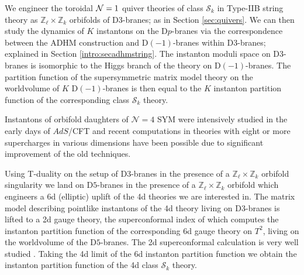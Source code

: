 \documentclass[main.tex]{subfiles}
\begin{document}
We engineer the toroidal $\mathcal{N}=1$ quiver theories of class $\mathcal{S}_k$ in Type-IIB string theory as $\mathbb{Z}_\ell \times \mathbb{Z}_k$ orbifolds of D$3$-branes; as in Section \ref{sec:quivers}.
We can then study the dynamics of $K$ instantons on the D$p$-branes via
the correspondence between the ADHM construction \cite{Atiyah:1978ri} and D$(-1)$-branes within D$3$-branes; explained in Section \ref{intro:secadhmstring}. The instanton moduli space on D$3$-branes is isomorphic to the Higgs branch of the theory on D$(-1)$-branes.
The partition function of the supersymmetric matrix model theory on the worldvolume of $K$ D$(-1)$-branes is then equal to the $K$ instanton partition function of the corresponding  class $\mathcal{S}_k$ theory.

Instantons of orbifold daughters of $\mathcal{N}=4$ SYM were intensively studied in the early days of $AdS$/CFT \cite{Dorey:1999pd,Hollowood:1999bm,Billo:2002hm,Billo:2006jm,Billo:2007py,Argurio:2007vqa,Billo:2008sp} and recent computations in theories with eight or more supercharges in various dimensions \cite{Hwang:2014uwa,Kim:2011mv,Kim:2017xan,Haghighat:2013tka,Haghighat:2013gba} have been possible due to significant improvement of the old techniques.

Using T-duality on the setup of D$3$-branes in the presence of a  $\mathbb{Z}_\ell \times \mathbb{Z}_k$ orbifold singularity we land on D$5$-branes in the presence of a $\mathbb{Z}_\ell \times \mathbb{Z}_k$ orbifold which engineers a 6d (elliptic) uplift of the 4d theories we are interested in.
The matrix model describing pointlike instantons of the 4d theory living on D$3$-branes is lifted to a 2d gauge theory, the superconformal index of which computes the instanton partition function of the corresponding 6d gauge theory on $T^2$, living on the worldvolume of the D$5$-branes. 
The 2d superconformal calculation is very well studied \cite{Putrov:2015jpa,Gadde:2013ftv,Gadde:2014ppa,Gadde:2013lxa,Nakayama:2011pa,Cordova:2017ohl}. 
Taking the 4d limit of the 6d instanton partition function
we obtain the instanton partition function of the 4d class $\mathcal{S}_k$ theory. 
\end{document}
